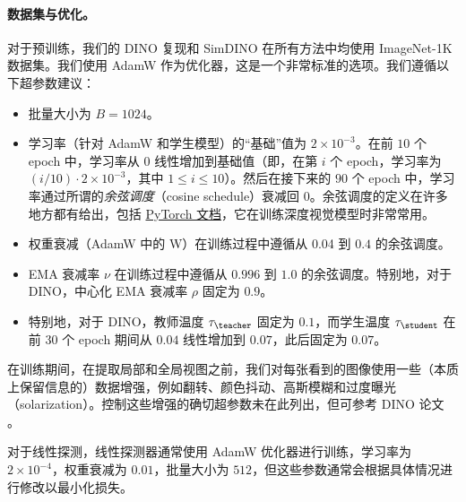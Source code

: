 \documentclass[../../book-main_zh.tex]{subfiles}
\begin{document}
\paragraph{数据集与优化。} 对于预训练，我们的 DINO 复现和 SimDINO 在所有方法中均使用 ImageNet-1K 数据集。我们使用 AdamW \citep{Loshchilov2017DecoupledWD} 作为优化器，这是一个非常标准的选项。我们遵循以下超参数建议：
\begin{itemize}
\item 批量大小为 \(B = 1024\)。
\item 学习率（针对 AdamW 和学生模型）的“基础”值为 \(2 \times 10^{-3}\)。在前 \(10\) 个 epoch 中，学习率从 \(0\) 线性增加到基础值（即，在第 \(i\) 个 epoch，学习率为 \((i/10) \cdot 2
    \times 10^{-3}\)，其中 \(1 \leq i \leq 10\)）。然后在接下来的 \(90\) 个 epoch 中，学习率通过所谓的\textit{余弦调度}（cosine schedule）衰减回 \(0\)。余弦调度的定义在许多地方都有给出，包括 \href{https://pytorch.org/docs/stable/generated/torch.optim.lr_scheduler.CosineAnnealingLR.html}{PyTorch 文档}，它在训练深度视觉模型时非常常用。
\item 权重衰减（AdamW 中的 W）在训练过程中遵循从 0.04 到 \(0.4\) 的余弦调度。
\item EMA 衰减率 \(\nu\) 在训练过程中遵循从 \(0.996\) 到 \(1.0\) 的余弦调度。特别地，对于 DINO，中心化 EMA 衰减率 \(\rho\) 固定为 \(0.9\)。
\item 特别地，对于 DINO，教师温度 \(\tau_{\teacher}\) 固定为 \(0.1\)，而学生温度 \(\tau_{\student}\) 在前 \(30\) 个 epoch 期间从 \(0.04\) 线性增加到 \(0.07\)，此后固定为 \(0.07\)。
\end{itemize}
在训练期间，在提取局部和全局视图之前，我们对每张看到的图像使用一些（本质上保留信息的）数据增强，例如翻转、颜色抖动、高斯模糊和过度曝光（solarization）。控制这些增强的确切超参数未在此列出，但可参考 DINO 论文 \citep{caron2021emerging}。

对于线性探测，线性探测器通常使用 AdamW 优化器进行训练，学习率为 \(2 \times 10^{-4}\)，权重衰减为 \(0.01\)，批量大小为 \(512\)，但这些参数通常会根据具体情况进行修改以最小化损失。
\end{document}
